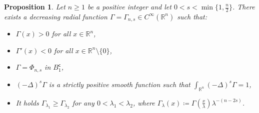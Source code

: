 \documentclass[10pt, reqno]{amsart}
\newcounter{results}[section] %
\theoremstyle{plain}
\newtheorem{proposition}[results]{Proposition}
\theoremstyle{remark}
\theoremstyle{definition}
\numberwithin{equation}{section}
\theoremstyle{plain}
\newcommand{\R}{\ensuremath{\mathbb R}} %
\renewcommand{\complement}{\ensuremath{\mathsf{c}}} %
\newcommand{\defeq}{\ensuremath{\coloneqq}}%
\newcommand{\lapl}{\ensuremath{\Delta}}
\begin{document}
\begin{proposition}\label{prop:Gamma_def}
    Let $n\ge 1$ be a positive integer and let $0<s < \min\{1, \tfrac n2\}$.
    There exists a decreasing radial function $\Gamma=\Gamma_{n,s}\in C^\infty(\R^n)$ such that:
    \begin{itemize}
        \item $\Gamma(x)>0$ for all $x\in\R^n$,
        \item $\Gamma'(x)<0$ for all $x\in\R^n\setminus\{0\}$,
        \item $\Gamma=\Phi_{n,s}$ in $B_1^\complement$,
        \item $(-\lapl)^s\Gamma$ is a strictly positive smooth function such that $\int_{\R^n}(-\lapl)^s\Gamma=1$,
        \item It holds $\Gamma_{\lambda_1}\ge \Gamma_{\lambda_2}$ for any $0<\lambda_1<\lambda_2$, where $\Gamma_\lambda(x)\defeq \Gamma(\frac x\lambda)\lambda^{-(n-2s)}$.
    \end{itemize}
\end{proposition}
\end{document}

